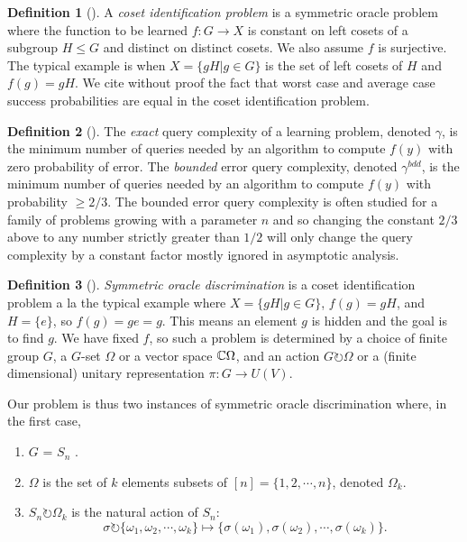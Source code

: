 \documentclass[12pt,twoside]{reedthesis}
\theoremstyle{plain}   %
\theoremstyle{definition}
\newtheorem{defn}{Definition}[section]
\theoremstyle{remark}
\numberwithin{equation}{section}
\def\acts{\circlearrowright} %
\begin{document}
  \begin{defn}[{\cite[Section 2]{copeland}}]
    A \emph{coset identification problem} is a symmetric oracle problem where
    the function to be learned $f: G \to X$ is constant on left cosets of a subgroup $H \leq G$ and distinct on distinct cosets.
    We also assume $f$ is surjective.
    The typical example is when $X = \{gH | g \in G\}$ is the set of left cosets of $H$ and $f(g) = gH$.
    We cite without proof the fact that worst case and average case success probabilities are equal in the coset identification problem.
  \end{defn}
  \begin{defn}[{\cite[Section 2]{copeland}}]
    The \emph{exact}
    query complexity of a learning problem, denoted $\gamma$, is the minimum number of queries needed by an algorithm
    to compute $f (y)$ with zero probability of error. The \emph{bounded} error query complexity, denoted $\gamma^{bdd}$, is the minimum
    number of queries needed by an algorithm to compute $f (y)$ with probability $\geq 2/3$. The bounded
    error query complexity is often studied for a family of problems growing with a parameter $n$ and
    so changing the constant $2/3$ above to any number strictly greater than $1/2$ will only change the
    query complexity by a constant factor mostly ignored in asymptotic analysis.
  \end{defn}
  \begin{defn}[{\cite[Section 4]{copeland}}]
    \emph{Symmetric oracle discrimination} is a coset identification problem a la the typical example where $X = \{gH | g \in G\}$, $f(g) = gH$, and $H = \{e\}$, so $f(g) = g e = g$.
    This means an element $g$ is hidden and the goal is to find $g$.
    We have fixed $f$, so such a problem is determined by a choice of finite group $G$, a $G$-set $\Omega$ or a vector space $\mathbb{C} \Omega$, and an action $G \acts \Omega$ or a (finite dimensional) unitary representation $\pi: G \to U(V)$.
  \end{defn}
  Our problem is thus two instances of symmetric oracle discrimination where, in the first case,
  \begin{enumerate}
  \item $G$ = $S_n$ .
  \item $\Omega$ is the set of $k$ elements subsets of $[n] = \{ 1, 2, \cdots, n\}$, denoted $\Omega_k$.
  \item $S_n \acts \Omega_k$ is the natural action of $S_n$:
    \[\sigma \acts \{ \omega_1, \omega_2, \cdots, \omega_k \} \mapsto \{ \sigma(\omega_1), \sigma(\omega_2), \cdots, \sigma(\omega_k)\}.\]
  \end{enumerate}
\end{document}
